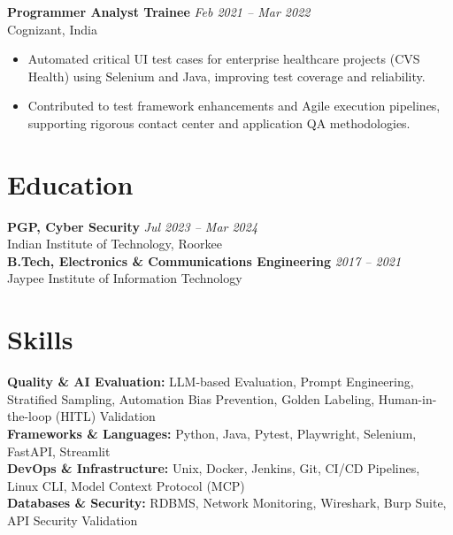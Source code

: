 \documentclass[a4paper,10pt]{article}
\begin{document}
\textbf{Programmer Analyst Trainee} \hfill \textit{Feb 2021 – Mar 2022}\\
Cognizant, India
\begin{itemize}
    \item Automated critical UI test cases for enterprise healthcare projects (CVS Health) using Selenium and Java, improving test coverage and reliability.
    \item Contributed to test framework enhancements and Agile execution pipelines, supporting rigorous contact center and application QA methodologies.
\end{itemize}

\section{Education}

\textbf{PGP, Cyber Security} \hfill \textit{Jul 2023 – Mar 2024}\\
Indian Institute of Technology, Roorkee\\[4pt]
\textbf{B.Tech, Electronics \& Communications Engineering} \hfill \textit{2017 – 2021}\\
Jaypee Institute of Information Technology

\section{Skills}

\textbf{Quality \& AI Evaluation:} LLM-based Evaluation, Prompt Engineering, Stratified Sampling, Automation Bias Prevention, Golden Labeling, Human-in-the-loop (HITL) Validation\\
\textbf{Frameworks \& Languages:} Python, Java, Pytest, Playwright, Selenium, FastAPI, Streamlit\\
\textbf{DevOps \& Infrastructure:} Unix, Docker, Jenkins, Git, CI/CD Pipelines, Linux CLI, Model Context Protocol (MCP)\\
\textbf{Databases \& Security:} RDBMS, Network Monitoring, Wireshark, Burp Suite, API Security Validation
\end{document}

